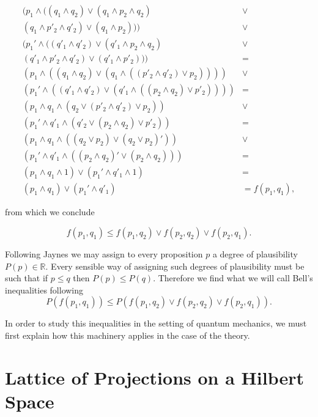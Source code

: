 \begin{align}
(p_1\wedge((q_1 \wedge q_2)\vee( q_1\wedge  p_2\wedge q_2)&\vee \nonumber \\
(q_1\wedge  p'_2 \wedge q'_2)\vee ( q_1\wedge  p_2))) & \vee\nonumber \\
(p_1'\wedge((q'_1 \wedge q'_2)\vee (q'_1\wedge  p_2\wedge q_2)&\vee \nonumber \\
(q'_1\wedge  p'_2 \wedge q'_2)\vee (q'_1\wedge  p'_2 ))) &= \nonumber \\
(p_1\wedge((q_1 \wedge q_2)\vee (q_1\wedge(( p'_2 \wedge q'_2)\vee p_2))))&\vee \nonumber \\
(p_1'\wedge((q'_1 \wedge q'_2)\vee (q'_1\wedge ((p_2\wedge q_2)\vee p'_2) )))&= \nonumber \\
(p_1\wedge q_1\wedge (q_2\vee ( p'_2 \wedge q'_2)\vee p_2))&\vee\nonumber  \\
(p_1'\wedge q'_1 \wedge (q'_2 \vee (p_2\wedge q_2) \vee p'_2) )&= \nonumber \\ 
(p_1\wedge q_1\wedge ((q_2 \vee p_2) \vee (q_2 \vee p_2)'))&\vee \nonumber \\
(p_1'\wedge q'_1 \wedge ((p_2\wedge q_2)'\vee (p_2\wedge q_2)) )&= \nonumber \\
(p_1\wedge q_1\wedge 1)\vee (p_1'\wedge q'_1 \wedge 1)&=\nonumber  \\
(p_1\wedge q_1)\vee (p_1'\wedge q'_1)&=f(p_1,q_1),\nonumber 
\end{align}
 
    
from which we conclude 

\begin{equation}
f(p_1,q_1)\leq f(p_1,q_2)\vee f(p_2,q_2)\vee f(p_2,q_1). 
\end{equation}

Following Jaynes \cite{Jaynes2003} we may assign to every proposition $p$ a degree of plausibility $P(p)\in\mathbb{R}$. Every sensible way of assigning such degrees of plausibility must be such that if $p\leq q$ then $P(p)\leq P(q)$. Therefore we find what we will call Bell's inequalities following \cite{Reyes2013}
\begin{equation}
P(f(p_1,q_1))\leq P(f(p_1,q_2)\vee f(p_2,q_2)\vee f(p_2,q_1)). 
\end{equation}

In order to study this inequalities in the setting of quantum mechanics, we must first explain how this machinery applies in the case of the theory.

\section{Lattice of Projections on a Hilbert Space}\label{sec:Q_logic}

